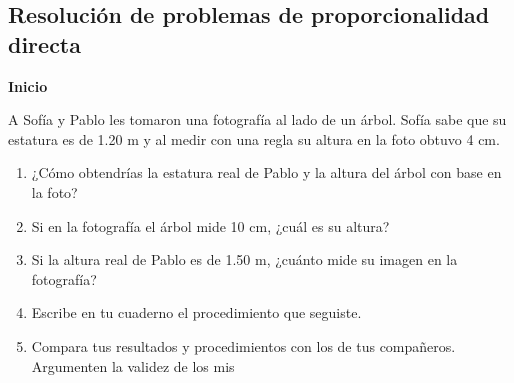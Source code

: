 \subsection{Resolución de problemas de proporcionalidad directa}
\begin{boxK}
    \begin{center}\textbf{Inicio}\end{center}
    A Sofía y Pablo les tomaron una fotografía al lado de un árbol. Sofía sabe que su estatura es
    de 1.20 m y al medir con una regla su altura en la foto obtuvo 4 cm.
    \begin{enumerate}
        \item ¿Cómo obtendrías la estatura real de Pablo y la altura del árbol con base en la
              foto?
        \item Si en la fotografía el árbol mide 10 cm, ¿cuál es su altura?
        \item Si la altura real de Pablo es de 1.50 m, ¿cuánto mide su imagen en la fotografía?
        \item Escribe en tu cuaderno el procedimiento que seguiste.
        \item Compara tus resultados y procedimientos con los de tus compañeros. Argumenten la validez de los mis
    \end{enumerate}

\end{boxK}

